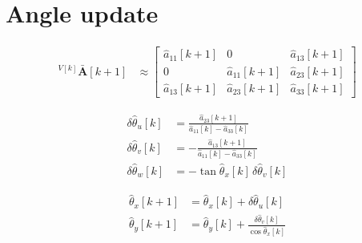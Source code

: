 \documentclass[11pt,a4paper]{ctexart}
\newcommand{\Ab}{\bar{\mathbf A}}
\newcommand{\dth}{\delta\hat\theta}
\begin{document}
\section{Angle update}

\vspace{1.2em}
\begin{align*}
{}^{V[k]}\Ab[k+1] &\approx \begin{bmatrix} \hat a_{11}[k+1] & 0 & \hat a_{13}[k+1] \\ 0 & \hat a_{11}[k+1] & \hat a_{23}[k+1] \\ \hat a_{13}[k+1] & \hat a_{23}[k+1] & \hat a_{33}[k+1] \end{bmatrix}
\end{align*}

\vspace{2.2em}
\begin{align*}
\dth_u[k] &= \frac{\hat a_{23}[k+1]}{\hat a_{11}[k] - \hat a_{33}[k]} \\[4pt]
\dth_v[k] &= -\frac{\hat a_{13}[k+1]}{\hat a_{11}[k] - \hat a_{33}[k]} \\[4pt]
\dth_w[k] &= -\tan\hat\theta_x[k]\,\dth_v[k]
\end{align*}

\vspace{2.2em}
\begin{align*}
\hat\theta_x[k+1] &= \hat\theta_x[k] + \dth_u[k] \\[4pt]
\hat\theta_y[k+1] &= \hat\theta_y[k] + \frac{\dth_v[k]}{\cos\hat\theta_x[k]}
\end{align*}

\clearpage
\end{document}
